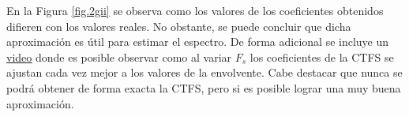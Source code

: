 \documentclass{article}
\begin{document}
    En la Figura \ref{fig.2gii} se observa como los valores de los coeficientes obtenidos difieren con los valores reales. No obstante, se puede concluir que dicha aproximación es útil para estimar el espectro. De forma adicional se incluye un \href{https://drive.google.com/open?id=10pVC59n6z_zfX6Qlm4w96l_1q3lnr2g6}{\underline{video}}
    donde es posible observar como al variar $F_s$ los coeficientes de la CTFS se ajustan cada vez mejor a los valores de la envolvente. Cabe destacar que nunca se podrá obtener de forma exacta la CTFS, pero si es posible lograr una muy buena aproximación. 
\end{document}
